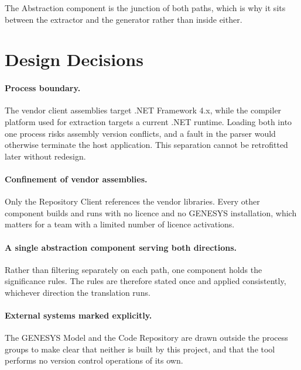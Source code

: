 The Abstraction component is the junction of both paths, which is why it sits
between the extractor and the generator rather than inside either.

\section{Design Decisions}

\paragraph{Process boundary.}
The vendor client assemblies target .NET Framework 4.x, while the compiler
platform used for extraction targets a current .NET runtime. Loading both into
one process risks assembly version conflicts, and a fault in the parser would
otherwise terminate the host application. This separation cannot be retrofitted
later without redesign.

\paragraph{Confinement of vendor assemblies.}
Only the Repository Client references the vendor libraries. Every other
component builds and runs with no licence and no GENESYS installation, which
matters for a team with a limited number of licence activations.

\paragraph{A single abstraction component serving both directions.}
Rather than filtering separately on each path, one component holds the
significance rules. The rules are therefore stated once and applied
consistently, whichever direction the translation runs.

\paragraph{External systems marked explicitly.}
The GENESYS Model and the Code Repository are drawn outside the process groups
to make clear that neither is built by this project, and that the tool performs
no version control operations of its own.
